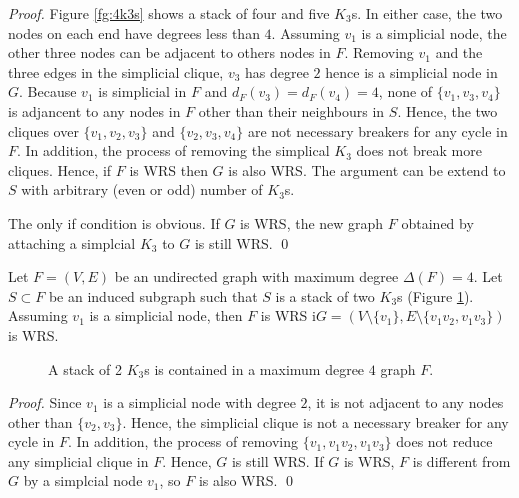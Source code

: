 \begin{proof}
Figure \ref{fg:4k3s} shows a stack of four and five $K_3$s. In either case, the two nodes on each end have degrees less than $4$. Assuming $v_1$ is a simplicial node, the other three nodes can be adjacent to others nodes in $F$. Removing $v_1$ and the three edges in the simplicial clique, $v_3$ has degree $2$ hence is a simplicial node in $G$. Because $v_1$ is simplicial in $F$ and $d_F(v_3)=d_F(v_4)=4$, none of $\{v_1,v_3,v_4\}$ is adjancent to any nodes in $F$ other than their neighbours in $S$. Hence, the two cliques over $\{v_1,v_2,v_3\}$ and $\{v_2,v_3,v_4\}$ are not necessary breakers for any cycle in $F$. In addition, the process of removing the simplical $K_3$ does not break more cliques. Hence, if $F$ is WRS then $G$ is also WRS. The argument can be extend to $S$ with arbitrary (even or odd) number of $K_3$s. 

The only if condition is obvious. If $G$ is WRS, the new graph $F$ obtained by attaching a simplcial $K_3$ to $G$ is still WRS. \qed
\end{proof}


\begin{lemma}
\label{lm:2k3s}
Let $F=(V,E)$ be an undirected graph with maximum degree $\Delta(F)=4$. Let $S\subset F$ be an induced subgraph such that $S$ is a stack of two $K_3$s (Figure \ref{fg:2k3s}). Assuming $v_1$ is a simplicial node, then $F$ is WRS i$G=(V\setminus \{v_1\},E\setminus \{v_1v_2,v_1v_3\})$ is WRS.
\begin{figure}[H]
\centering
{}
\caption{A stack of 2 $K_3$s is contained in a maximum degree $4$ graph $F$.}
\label{fg:2k3s}
\end{figure}
\end{lemma}
\begin{proof}
Since $v_1$ is a simplicial node with degree $2$, it is not adjacent to any nodes other than $\{v_2,v_3\}$. Hence, the simplicial clique is not a necessary breaker for any cycle in $F$. In addition, the process of removing $\{v_1, v_1v_2,v_1v_3\}$ does not reduce any simplicial clique in $F$. Hence, $G$ is still WRS. If $G$ is WRS, $F$ is different from $G$ by a simplcial node $v_1$, so $F$ is also WRS. \qed
\end{proof}

